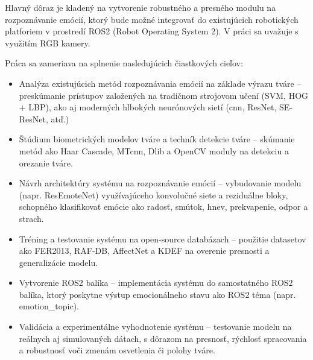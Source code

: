 Hlavný dôraz je kladený na vytvorenie robustného a presného modulu na rozpoznávanie emócií, ktorý bude možné integrovať do existujúcich robotických platforiem v prostredí ROS2 (Robot Operating System 2). 
V práci sa uvažuje s využitím RGB kamery.

Práca sa zameriava na splnenie nasledujúcich čiastkových cieľov:

\begin{itemize}
    \item Analýza existujúcich metód rozpoznávania emócií na základe výrazu tváre – preskúmanie prístupov založených na tradičnom strojovom učení (SVM, HOG + LBP), ako aj moderných hlbokých neurónových sietí 
(\gls{cnn}, ResNet, SE-ResNet, atď.)

    \item Štúdium biometrických modelov tváre a techník detekcie tváre – skúmanie metód ako Haar Cascade, MT\gls{cnn}, Dlib a OpenCV moduly na detekciu a orezanie tváre.

    \item Návrh architektúry systému na rozpoznávanie emócií – vybudovanie modelu (napr. ResEmoteNet) využívajúceho konvolučné siete a reziduálne bloky, schopného klasifikovať emócie ako radosť, smútok, hnev, prekvapenie, 
odpor a strach.

    \item Tréning a testovanie systému na open-source databázach – použitie datasetov ako FER2013, RAF-DB, AffectNet a KDEF na overenie presnosti a generalizácie modelu.

    \item Vytvorenie ROS2 balíka – implementácia systému do samostatného ROS2 balíka, ktorý poskytne výstup emocionálneho stavu ako ROS2 téma (napr. emotion\_topic).

    \item Validácia a experimentálne vyhodnotenie systému – testovanie modelu na reálnych aj simulovaných dátach, s dôrazom na presnosť, rýchlosť spracovania a robustnosť voči zmenám osvetlenia či polohy tváre.
\end{itemize}

